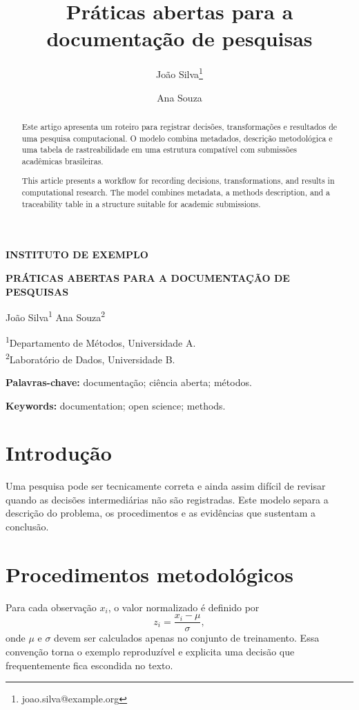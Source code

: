 \documentclass[12pt,a4paper]{article}
\title{Práticas abertas para a documentação de pesquisas}
\author{João Silva\thanks{joao.silva@example.org} \and Ana Souza}
\date{}
\begin{document}
\begin{center}
  {\large\bfseries INSTITUTO DE EXEMPLO}\par
  \vspace{6pt}
  {\Large\bfseries \MakeUppercase{Práticas abertas para a documentação de pesquisas}}\par
  \vspace{6pt}
  João Silva\textsuperscript{1} \quad Ana Souza\textsuperscript{2}
\end{center}
\noindent\textsuperscript{1}Departamento de Métodos, Universidade A.\\
\textsuperscript{2}Laboratório de Dados, Universidade B.

\begin{abstract}
Este artigo apresenta um roteiro para registrar decisões, transformações e
resultados de uma pesquisa computacional. O modelo combina metadados,
descrição metodológica e uma tabela de rastreabilidade em uma estrutura
compatível com submissões acadêmicas brasileiras.
\end{abstract}
\noindent\textbf{Palavras-chave:} documentação; ciência aberta; métodos.

\begin{abstract}
This article presents a workflow for recording decisions, transformations, and
results in computational research. The model combines metadata, a methods
description, and a traceability table in a structure suitable for academic
submissions.
\end{abstract}
\noindent\textbf{Keywords:} documentation; open science; methods.

\section{Introdução}
Uma pesquisa pode ser tecnicamente correta e ainda assim difícil de revisar
quando as decisões intermediárias não são registradas. Este modelo separa a
descrição do problema, os procedimentos e as evidências que sustentam a
conclusão.

\section{Procedimentos metodológicos}
Para cada observação $x_i$, o valor normalizado é definido por
\begin{equation}
  z_i = \frac{x_i-\mu}{\sigma},
  \label{eq:normalization}
\end{equation}
onde $\mu$ e $\sigma$ devem ser calculados apenas no conjunto de treinamento.
Essa convenção torna o exemplo reproduzível e explicita uma decisão que
frequentemente fica escondida no texto.
\end{document}

